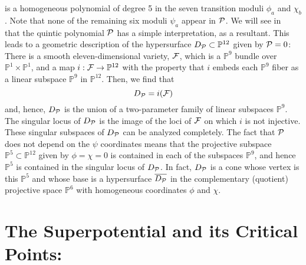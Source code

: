 \documentclass[a4paper,12pt]{article}
\numberwithin{equation}{section}
\theoremstyle{plain}
\begin{document}
%
is a homogeneous polynomial of degree 5 in
the seven transition moduli
$\phi_a$ and $\chi_b$. Note that none of the remaining six moduli $\psi_a$
appear in ${\cal{P}}$.
We will see in~\cite{BDOnew} that the quintic polynomial ${\cal{P}}$ has
a simple interpretation, as a resultant. This leads to a geometric description of
the hypersurface $D_{{\cal{P}}} \subset {\mathbb P}^{12}$ given by ${\cal{P}}=0$:
There is a smooth
eleven-dimensional variety, ${\cal{F}}$, which is a ${\mathbb P}^{9}$ bundle over
${\mathbb P}^{1} \times {\mathbb P}^{1}$, and a map $i:{\cal{F}}
\rightarrow {\mathbb P}^{12}$ with the property that $i$ embeds each
${\mathbb P}^{9}$ fiber as a linear subspace ${\mathbb P}^{9}$ in ${\mathbb
P}^{12}$. Then, we find that
%
\begin{equation}
D_{{\cal{P}}}=i({\cal{F}})
\label{82aa}
\end{equation}
%
and, hence, $D_{{\cal{P}}}$ is the union of a two-parameter family of linear
subspaces ${\mathbb P}^{9}$.  The singular locus of $D_{{\cal{P}}}$
is the image of the loci of ${\cal{F}}$ on which $i$ is not
injective. These singular subspaces of $D_{{\cal{P}}}$ can be analyzed
completely. The fact that ${\cal{P}}$ does not depend on the $\psi$
coordinates means that the projective subspace
${\mathbb P}^{5} \subset {\mathbb P}^{12}$ given by
$\phi=\chi=0$ is contained in each of the subspaces ${\mathbb P}^{9}$, and hence
${\mathbb P}^{5}$ is contained in the singular locus of $D_{{\cal{P}}}$. In fact,
$D_{{\cal{P}}}$ is a cone whose vertex is this ${\mathbb P}^{5}$ and whose base is
a hypersurface $\overline{D_{{\cal{P}}}}$ in the complementary (quotient)
projective space ${\mathbb P}^{6}$ with homogeneous coordinates $\phi$ and $\chi$.



\section{The Superpotential and its Critical Points:}
\end{document}
